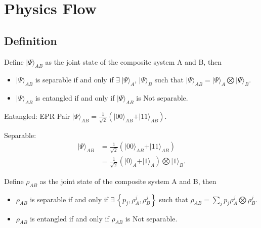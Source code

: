 \documentclass[../../note.tex]{subfiles}
\begin{document}
\chapter{Physics Flow}
\section{Definition}
\begin{definition}
    Define $\vert \Psi \rangle_{AB}$ as the joint state of the composite system A and B, then
    \begin{itemize}
        \item $\vert \Psi \rangle_{AB}$ is separable if and only if $\exists~\vert \Psi \rangle_A$, $\vert \Psi \rangle_B$ such that $\vert \Psi \rangle_{AB} = \vert \Psi \rangle_A \bigotimes \vert \Psi \rangle_B$.
        \item $\vert \Psi \rangle_{AB}$ is entangled if and only if $\vert \Psi \rangle_{AB}$ is Not separable. 
    \end{itemize}
\end{definition}

\begin{example}
    Entangled: EPR Pair $\vert \Psi \rangle_{AB} = \frac{1}{\sqrt{2}} (\vert 00 \rangle_{AB} + \vert 11 \rangle_{AB})$.

    Separable:
    \begin{align}
        \vert \Psi \rangle_{AB}
        &= \frac{1}{\sqrt{2}} (\vert 00 \rangle_{AB} + \vert 11 \rangle_{AB}) \\
        &= \frac{1}{\sqrt{2}} (\vert 0 \rangle_A + \vert 1 \rangle_A) \bigotimes \vert 1 \rangle_B.
    \end{align}
\end{example}

\begin{definition}
    Define $\rho_{AB}$ as the joint state of the composite system A and B, then
    \begin{itemize}
        \item $\rho_{AB}$ is separable if and only if $\exists~\left\{p_j, \rho_A^j, \rho_B^j\right\}$ such that $\rho_{AB} = \sum_j p_j \rho_A^j \bigotimes \rho_B^j$.
        \item $\rho_{AB}$ is entangled if and only if $\rho_{AB}$ is Not separable. 
    \end{itemize}
\end{definition}
\end{document}
